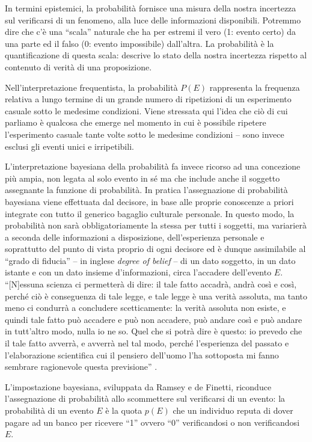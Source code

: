 \documentclass[
  11pt,
]{krantz}
\theoremstyle{definition}
\theoremstyle{definition}
\theoremstyle{definition}
\theoremstyle{definition}
\theoremstyle{remark}
\begin{document}
In termini epistemici, la probabilità fornisce una misura della nostra incertezza sul verificarsi di un fenomeno, alla luce delle informazioni disponibili. Potremmo dire che c'è una ``scala'' naturale che ha per estremi il vero (1: evento certo) da una parte ed il falso (0: evento impossibile) dall'altra. La probabilità è la quantificazione di questa scala: descrive lo stato della nostra incertezza rispetto al contenuto di verità di una proposizione.

Nell'interpretazione frequentista, la probabilità \(P(E)\) rappresenta la frequenza relativa a lungo termine di un grande numero di ripetizioni di un esperimento casuale sotto le medesime condizioni. Viene stressata qui l'idea che ciò di cui parliamo è qualcosa che emerge nel momento in cui è possibile ripetere l'esperimento casuale tante volte sotto le medesime condizioni -- sono invece esclusi gli eventi unici e irripetibili.

L'interpretazione bayesiana della probabilità fa invece ricorso ad una concezione più ampia, non legata al solo evento in sé ma che include anche il soggetto assegnante la funzione di probabilità. In pratica l'assegnazione di probabilità bayesiana viene effettuata dal decisore, in base alle proprie conoscenze a priori integrate con tutto il generico bagaglio culturale personale. In questo modo, la probabilità non sarà obbligatoriamente la stessa per tutti i soggetti, ma variarierà a seconda delle informazioni a disposizione, dell'esperienza personale e soprattutto del punto di vista proprio di ogni decisore ed è dunque assimilabile al ``grado di fiducia'' -- in inglese \emph{degree of belief} -- di un dato soggetto, in un dato istante e con un dato insieme d'informazioni, circa l'accadere dell'evento \(E\). ``{[}N{]}essuna scienza ci permetterà di dire: il tale fatto accadrà, andrà così e così, perché ciò è conseguenza di tale legge, e tale legge è una verità assoluta, ma tanto meno ci condurrà a concludere scetticamente: la verità assoluta non esiste, e quindi tale fatto può accadere e può non accadere, può andare così e può andare in tutt'altro modo, nulla io ne so. Quel che si potrà dire è questo: io prevedo che il tale fatto avverrà, e avverrà nel tal modo, perché l'esperienza del passato e l'elaborazione scientifica cui il pensiero dell'uomo l'ha sottoposta mi fanno sembrare ragionevole questa previsione'' \citep{definetti1931prob}.

L'impostazione bayesiana, sviluppata da Ramsey e de Finetti, riconduce l'assegnazione di probabilità allo scommettere sul verificarsi di un evento: la probabilità di un evento \(E\) è la quota \(p(E)\) che un individuo reputa di dover pagare ad un banco per ricevere ``1'' ovvero ``0'' verificandosi o non verificandosi \(E\).
\end{document}

